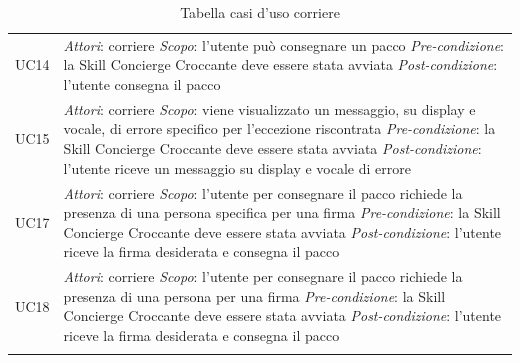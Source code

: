\begin{center}
\begin{longtable}{  p{2.5cm} p{9.8cm} }
		UC14 &  \textit{Attori}: corriere \newline \textit{Scopo}: l'utente può consegnare un pacco \newline \textit{Pre-condizione}: la Skill Concierge Croccante deve essere stata avviata \newline \textit{Post-condizione}: l'utente consegna il pacco \\
		
		UC15 &  \textit{Attori}: corriere \newline \textit{Scopo}: viene visualizzato un messaggio, su display e vocale, di errore specifico per l'eccezione riscontrata \newline \textit{Pre-condizione}: la Skill Concierge Croccante deve essere stata avviata \newline \textit{Post-condizione}: l'utente riceve un messaggio su display e vocale di errore\\
		
		UC17 &  \textit{Attori}: corriere \newline \textit{Scopo}: l'utente per consegnare il pacco richiede la presenza di una persona specifica per una firma \newline \textit{Pre-condizione}: la Skill Concierge Croccante deve essere stata avviata \newline \textit{Post-condizione}: l'utente riceve la firma desiderata e consegna il pacco\\
		
		UC18 &  \textit{Attori}: corriere \newline \textit{Scopo}: l'utente per consegnare il pacco richiede la presenza di una persona per una firma \newline \textit{Pre-condizione}: la Skill Concierge Croccante deve essere stata avviata \newline \textit{Post-condizione}: l'utente riceve la firma desiderata e consegna il pacco\\
		\rowcolor{white}
		\caption{Tabella casi d'uso corriere}
	\end{longtable}
\end{center}
